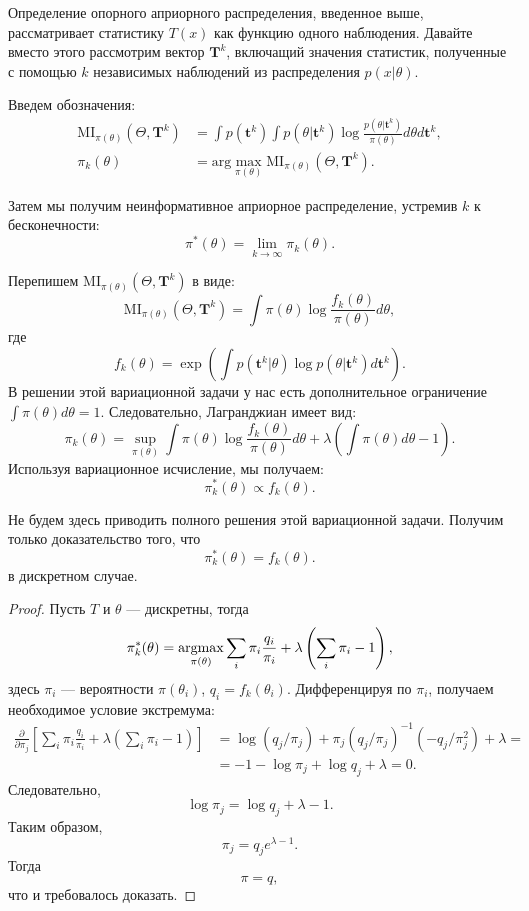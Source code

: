 Определение опорного априорного распределения, введенное выше,
рассматривает статистику $T(x)$ как функцию одного наблюдения.
Давайте вместо этого рассмотрим вектор $\mathbf{T}^k$,
включащий значения статистик, полученные с помощью $k$ независимых наблюдений из распределения $p(x| \theta)$.

Введем обозначения:
\begin{align*}
\mathrm{MI}_{\pi(\theta)}(\Theta, \mathbf{T}^k) &= \int p(\mathbf{t}^k) \int p(\theta | \mathbf{t}^k) \log \frac{p(\theta | \mathbf{t}^k)}{\pi(\theta)} d\theta d\mathbf{t}^k, \\
\pi_k(\theta) &= \mathrm{arg} \max_{\pi(\theta)} \mathrm{MI}_{\pi(\theta)}(\Theta, \mathbf{T}^k).
\end{align*}

Затем мы получим неинформативное априорное распределение, устремив $k$ к бесконечности:
\[
\pi^*(\theta) = \lim_{k \rightarrow \infty} \pi_k(\theta).
\]

Перепишем $\mathrm{MI}_{\pi(\theta)}(\Theta, \mathbf{T}^k)$ в виде:
\[
\mathrm{MI}_{\pi(\theta)}(\Theta, \mathbf{T}^k) = \int \pi(\theta) \log \frac{f_k(\theta)}{\pi(\theta)} d\theta,
\]
где 
\[
f_k(\theta) = \exp \left(\int p(\mathbf{t}^k | \theta) \log p(\theta | \mathbf{t}^k) d \mathbf{t}^k \right).
\]
В решении этой вариационной задачи у нас есть дополнительное ограничение $\int \pi(\theta) d\theta = 1$.
Следовательно, Лагранджиан имеет вид:
\[
\pi_k(\theta) = \sup_{\pi(\theta)} \int \pi(\theta) \log \frac{f_k(\theta)}{\pi(\theta)} d\theta + \lambda \left(\int \pi(\theta) d\theta - 1 \right).
\]
Используя вариационное исчисление, мы получаем:
\[
\pi^*_k(\theta) \propto f_k(\theta).
\]

Не будем здесь приводить полного решения этой вариационной задачи.
Получим только доказательство того, что 
\[
\pi^*_k(\theta) = f_k(\theta).
\]
в дискретном случае.
\begin{proof}
Пусть $T$ и $\theta$ --- дискретны, тогда
\[
\pi^*_k(\theta) = \argmax_{\pi(\theta)} \sum_i \pi_i \frac{q_i}{\pi_i} + \lambda \left(\sum_i \pi_i - 1\right),
\]
здесь $\pi_i$ --- вероятности $\pi(\theta_i)$, $q_i = f_k(\theta_i)$.
Дифференцируя по $\pi_i$, получаем необходимое условие экстремума:
\begin{align*}
\frac{\partial}{\partial \pi_j} \left[ \sum_i \pi_i \frac{q_i}{\pi_i} + \lambda \left(\sum_i \pi_i - 1\right)\right] &= \log (q_j / \pi_j) + \pi_j (q_j / \pi_j)^{-1} (-q_j / \pi_j^2) + \lambda= \\
&= -1 -\log \pi_j + \log q_j + \lambda = 0.
\end{align*}
Следовательно,
\[
\log \pi_j = \log q_j + \lambda - 1.
\]
Таким образом,
\[
\pi_j = q_j e^{\lambda - 1}.
\]
Тогда 
\[
\pi = q,
\]
что и требовалось доказать.
\end{proof}

